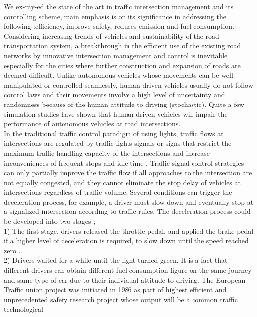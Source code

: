 \documentclass{book}
\begin{document}
We ex-ray-ed the state of the art in traffic intersection management and its controlling scheme, main emphasis is on its significance in addressing the following :efficiency, improve safety, reduces emission and fuel consumption.\\
Considering increasing trends of vehicles and sustainability of the road transportation system, a breakthrough in the efficient use of the existing road networks by innovative intersection management and control is inevitable especially for the cities where further construction and expansion of roads are deemed difficult. Unlike   autonomous vehicles whose  movements  can  be  well  manipulated or controlled seamlessly, human driven vehicles usually do not follow control laws and their movements involve a high level of uncertainty and randomness because of the human attitude to driving (stochastic). Quite a few simulation studies have shown that human driven vehicles will impair the performance of autonomous vehicles at road intersections\cite{calvert2011modelling,milanes2014cooperative,van2006impact,wang2015longitudinal}. \\
	 In the traditional traffic control paradigm of using lights, traffic flows at intersections are regulated by traffic lights signals or signs that restrict the maximum traffic handling capacity of the intersections and increase inconveniences of frequent stops and idle time \cite{papageorgiou2003review,treiber2000congested,kamal2012control}. Traffic signal control strategies can only partially improve the traffic flow if all approaches to the intersection are not equally congested, and they cannot eliminate the stop delay of vehicles at intersections regardless of traffic volume. Several conditions can trigger the deceleration process, for example, a driver must slow down and eventually stop at a signalized intersection according to traffic rules. The deceleration process could be developed into two stages \cite{wada2007analysis, yang2010development, wang2011safety}; \\ 1) The first stage, drivers released the throttle pedal, and applied the brake pedal if a higher level of deceleration is required, to slow down until the speed reached zero . \\
	 2) Drivers waited for a while until the light turned green\cite{wu2011fuel}. It is a fact that different drivers can obtain different fuel consumption figure on the same journey and same type of car due to their individual attitude to driving. The European Traffic union project was initiated in 1986 as part of highest efficient and unprecedented safety research project whose output will be a common traffic technological
\end{document}
